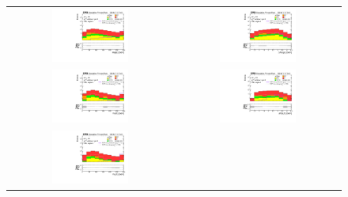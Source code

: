  \begin{figure}[tbh!]
 \begin{center}
 \begin{tabular}{cc}
 \includegraphics[width=0.48\textwidth]{figures/Part4/Evt/LFVemuM}&
  \includegraphics[width=0.48\textwidth]{figures/Part4/Evt/LFVemuDr}\\
 \includegraphics[width=0.48\textwidth]{figures/Part4/Evt/LFVetaM}&
  \includegraphics[width=0.48\textwidth]{figures/Part4/Evt/LFVetaDr}\\
 \includegraphics[width=0.48\textwidth]{figures/Part4/Evt/LFVmutaM}&

\end{tabular}
\end{center}
\end{figure}
